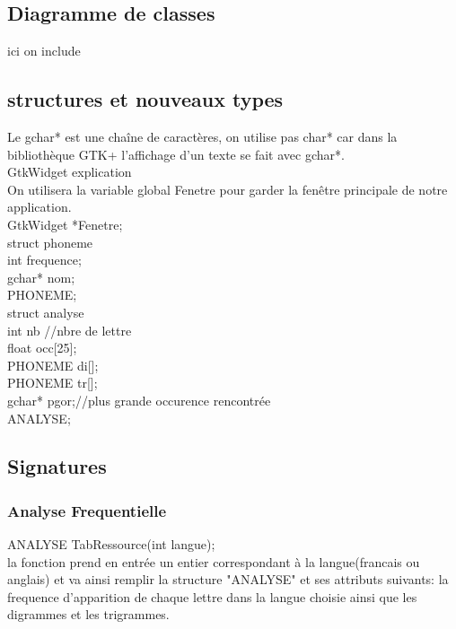 \documentclass[a4]{article}
\begin{document}
		\subsection{Diagramme de classes}
		ici on include 
		\subsection{structures et nouveaux types}
		Le gchar* est une chaîne de caractères, on utilise pas char* car dans la bibliothèque
		GTK+ l'affichage d'un texte se fait avec gchar*.\\
		
		GtkWidget explication\\
		
		On utilisera la variable global Fenetre pour garder la fenêtre principale de notre application.\\
		GtkWidget *Fenetre; \\
		
	struct phoneme{\\
		int frequence;\\
		gchar* nom;\\
	}PHONEME;\\
	
	
	struct analyse{ \\
		int nb //nbre de lettre \\
		float occ[25];\\
		PHONEME di[];\\
		PHONEME tr[];\\
		gchar* pgor;//plus grande occurence rencontrée\\
	}ANALYSE;\\
	
		\subsection{Signatures}
		
	
	\subsubsection{Analyse Frequentielle}
	ANALYSE TabRessource(int langue);\\
		la fonction prend en entrée un entier correspondant à la langue(francais ou anglais)
		et va ainsi remplir la structure "ANALYSE" et ses attributs suivants:
		la frequence d'apparition de chaque lettre dans la langue choisie ainsi que les digrammes
		et les trigrammes.\\
		
\end{document}
